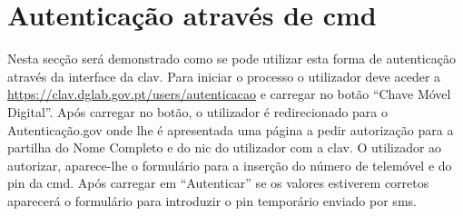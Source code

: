 \section{Autenticação através de \acrshort{cmd}}

Nesta secção será demonstrado como se pode utilizar esta forma de autenticação através da interface da \acrshort{clav}. Para iniciar o processo o utilizador deve aceder a \url{https://clav.dglab.gov.pt/users/autenticacao} e carregar no botão ``Chave Móvel Digital''. Após carregar no botão, o utilizador é redirecionado para o Autenticação.gov onde lhe é apresentada uma página a pedir autorização para a partilha do Nome Completo e do \acrshort{nic} do utilizador com a \acrshort{clav}. O utilizador ao autorizar, aparece-lhe o formulário para a inserção do número de telemóvel e do \acrshort{pin} da \acrshort{cmd}. Após carregar em ``Autenticar'' se os valores estiverem corretos aparecerá o formulário para introduzir o \acrshort{pin} temporário enviado por \acrshort{sms}.

